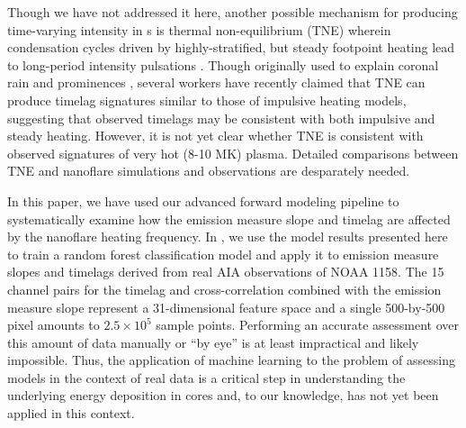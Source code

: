 Though we have not addressed it here, another possible mechanism for producing time-varying intensity in \AR s is thermal non-equilibrium (TNE) wherein condensation cycles driven by highly-stratified, but steady footpoint heating lead to long-period intensity pulsations \citep{kuin_thermal_1982}. Though originally used to explain coronal rain \citep{antolin_coronal_2010,antolin_multithermal_2015,auchere_coronal_2018} and prominences \citep{antiochos_model_1991}, several workers \citep{lionello_can_2016,winebarger_investigation_2016,froment_long-period_2017,winebarger_identifying_2018,froment_occurrence_2018} have recently claimed that TNE can produce timelag signatures similar to those of impulsive heating models, suggesting that observed timelags may be consistent with both impulsive and steady heating. However, it is not yet clear whether TNE is consistent with observed signatures of very hot (8-10 MK) plasma. Detailed comparisons between TNE and nanoflare simulations and observations are desparately needed.

In this paper, we have used our advanced forward modeling pipeline to systematically examine how the emission measure slope and timelag are affected by the nanoflare heating frequency. In , we use the model results presented here to train a random forest classification model and apply it to emission measure slopes and timelags derived from real AIA observations of NOAA 1158. The 15 channel pairs for the timelag and cross-correlation combined with the emission measure slope represent a 31-dimensional feature space and a single 500-by-500 pixel \AR{} amounts to $2.5\times10^5$ sample points. Performing an accurate assessment over this amount of data manually or ``by eye'' is at least impractical and likely impossible. Thus, the application of machine learning to the problem of assessing models in the context of real data is a critical step in understanding the underlying energy deposition in \AR{} cores and, to our knowledge, has not yet been applied in this context.  
